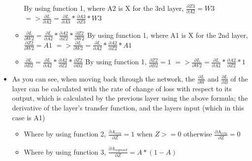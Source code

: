 \documentclass[./project-report/src/latex/project-report.tex]{subfiles}
\begin{document}
\begin{itemize}
\begin{itemize}
              \newline
              By using function 1, where A2 is X for the 3rd layer, $\frac{\partial{Z3}}{\partial{A2}} = W3$
              \vspace{1mm}
              \newline
              $=> \frac{\partial{L}}{\partial{A2}} =  \frac{\partial{L}}{\partial{A3}} * \frac{\partial{A3}}{\partial{Z3}} * W3$
        \item $\frac{\partial{L}}{\partial{W2}} = \frac{\partial{L}}{\partial{A2}} * \frac{\partial{A2}}{\partial{Z2}} * \frac{\partial{Z2}}{\partial{W2}}$
              \vspace{1mm}
              \newline
              By using function 1, where A1 is X for the 2nd layer, $\frac{\partial{Z2}}{\partial{W2}} = A1$
              \vspace{1mm}
              \newline
              $=> \frac{\partial{L}}{\partial{W2}} = \frac{\partial{L}}{\partial{A2}} * \frac{\partial{A2}}{\partial{Z2}} * A1$
        \item $\frac{\partial{L}}{\partial{B2}} = \frac{\partial{L}}{\partial{A2}} * \frac{\partial{A2}}{\partial{Z2}} * \frac{\partial{Z2}}{\partial{B2}}$
              \vspace{1mm}
              \newline
              By using function 1, $\frac{\partial{Z2}}{\partial{B2}} = 1$
              \vspace{1mm}
              \newline
              $=> \frac{\partial{L}}{\partial{W2}} = \frac{\partial{L}}{\partial{A2}} * \frac{\partial{A2}}{\partial{Z2}} * 1$
    \end{itemize}
    \item As you can see, when moving back through the network, the $\frac{\partial{L}}{\partial{W}}$ and $\frac{\partial{L}}{\partial{B}}$ of the layer can be 
          calculated with the rate of change of loss with respect to its output, which is calculated by the previous layer using the above formula; the derivative of 
          the layer's transfer function, and the layers input (which in this case is A1)
    \begin{itemize}
        \item Where by using function 2, $\frac{\partial{A_{relu}}}{\partial{Z}} = 1$ when $Z >= 0$ otherwise $\frac{\partial{A_{relu}}}{\partial{Z}} = 0$
        \item Where by using function 3, $\frac{\partial{A_{sigmoid}}}{\partial{Z}} = A * (1 - A)$

\end{itemize}
\end{itemize}
\end{document}
